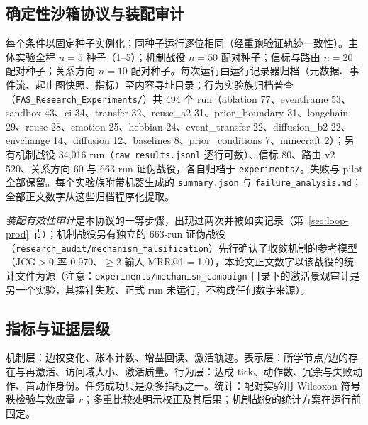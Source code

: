 \documentclass[10pt,a4paper]{ctexart}
\begin{document}
\subsection{确定性沙箱协议与装配审计}
每个条件以固定种子实例化；同种子运行逐位相同（经重跑验证轨迹一致性）。主体实验全程 $n{=}5$ 种子（1--5）；机制战役 $n{=}50$ 配对种子；信标与路由 $n{=}20$ 配对种子；关系方向 $n{=}10$ 配对种子。每次运行由运行记录器归档（元数据、事件流、起止图快照、指标）至内容寻址目录；行为实验族归档普查（\verb|FAS_Research_Experiments/|）共 494 个 run（ablation 77、eventframe 53、sandbox 43、ci 34、transfer 32、reuse\_a2 31、prior\_boundary 31、longchain 29、reuse 28、emotion 25、hebbian 24、event\_transfer 22、diffusion\_b2 22、envchange 14、diffusion 12、baselines 8、prior\_conditions 7、minecraft 2）；另有机制战役 34{,}016 run（\verb|raw_results.jsonl| 逐行可数）、信标 80、路由 v2 520、关系方向 60 与 663-run 证伪战役，各自归档于 \verb|experiments/|。失败与 pilot 全部保留。每个实验族附带机器生成的 \texttt{summary.json} 与 \texttt{failure\_analysis.md}；全部正文数字从这些归档程序化提取。

\emph{装配有效性审计}是本协议的一等步骤，出现过两次并被如实记录（第~\ref{sec:loop-prod} 节）；机制战役另有独立的 663-run 证伪战役（\texttt{research\_audit/mechanism\_falsification}）先行确认了收敛机制的参考模型（JCG$>{0}$ 率 0.970、$\ge$2 输入 MRR@1$=$1.0），本论文正文数字以该战役的统计文件为源（注意：\texttt{experiments/mechanism\_campaign} 目录下的激活景观审计是另一个实验，其探针失败、正式 run 未运行，不构成任何数字来源）。

\subsection{指标与证据层级}
机制层：边权变化、账本计数、增益回读、激活轨迹。表示层：所学节点/边的存在与再激活、访问域大小、激活质量。行为层：达成 tick、动作数、冗余与失败动作、首动作身份。任务成功只是众多指标之一。统计：配对实验用 Wilcoxon 符号秩检验与效应量 $r$；多重比较处明示校正及其后果；机制战役的统计方案在运行前固定。
\end{document}
